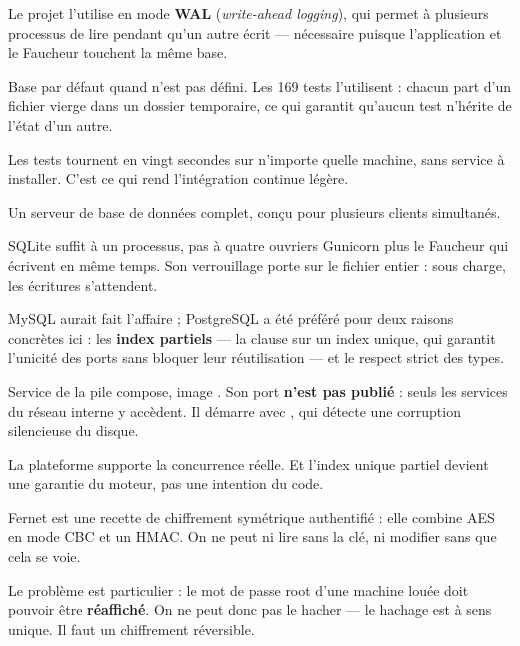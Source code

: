Le projet l'utilise en mode \textbf{WAL} (\emph{write-ahead logging}), qui
permet à plusieurs processus de lire pendant qu'un autre écrit --- nécessaire
puisque l'application et le Faucheur touchent la même base.

\role
Base par défaut quand  n'est pas défini. Les 169 tests
l'utilisent : chacun part d'un fichier vierge dans un dossier temporaire, ce qui
garantit qu'aucun test n'hérite de l'état d'un autre.

\apport
Les tests tournent en vingt secondes sur n'importe quelle machine, sans service
à installer. C'est ce qui rend l'intégration continue légère.


\quoi
Un serveur de base de données complet, conçu pour plusieurs clients simultanés.

\pourquoi
SQLite suffit à un processus, pas à quatre ouvriers Gunicorn plus le Faucheur
qui écrivent en même temps. Son verrouillage porte sur le fichier entier : sous
charge, les écritures s'attendent.

MySQL aurait fait l'affaire ; PostgreSQL a été préféré pour deux raisons
concrètes ici : les \textbf{index partiels} --- la clause  sur un
index unique, qui garantit l'unicité des ports sans bloquer leur
réutilisation --- et le respect strict des types.

\role
Service  de la pile compose, image . Son port
\textbf{n'est pas publié} : seuls les services du réseau interne y accèdent. Il
démarre avec , qui détecte une corruption silencieuse du
disque.

\apport
La plateforme supporte la concurrence réelle. Et l'index unique partiel devient
une garantie du moteur, pas une intention du code.


\quoi
Fernet est une recette de chiffrement symétrique authentifié : elle combine AES
en mode CBC et un HMAC. On ne peut ni lire sans la clé, ni modifier sans que
cela se voie.

\pourquoi
Le problème est particulier : le mot de passe root d'une machine louée doit
pouvoir être \textbf{réaffiché}. On ne peut donc pas le hacher --- le hachage est
à sens unique. Il faut un chiffrement réversible.

